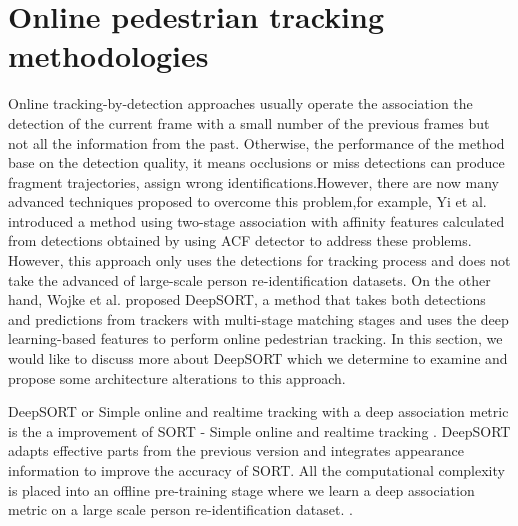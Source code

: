 \pagebreak
\section{Online pedestrian tracking methodologies}
\hspace{0.5cm} Online tracking-by-detection approaches usually operate the association the
detection of the current frame with a small number of the previous frames but not all the
information from the past. Otherwise, the performance of the method base on the detection quality,
it means occlusions or miss detections can produce fragment trajectories, assign wrong
identifications.However, there are now many advanced techniques proposed to overcome this
problem,for example, Yi et al. \cite{MultiTracking} introduced a method using two-stage association with affinity features
calculated from detections obtained by using ACF detector to address these problems. However, this approach
only uses the detections for tracking process and does not take the advanced of large-scale person re-identification datasets.
On the other hand, Wojke et al. \cite{Wojke2017simple} proposed DeepSORT, a method that takes both detections and predictions 
from trackers with multi-stage matching stages and uses the deep learning-based features to perform online pedestrian tracking.
In this section, we would like to discuss more about DeepSORT\cite{Wojke2017simple} which we determine to examine and propose some architecture alterations to this approach.\par

DeepSORT or Simple online and realtime tracking with a deep association metric \cite{Wojke2017simple} is 
the a improvement of SORT - Simple online and realtime tracking \cite{sort} . DeepSORT adapts effective parts from the previous version and integrates appearance information to improve the accuracy of SORT. All the computational complexity is placed 
into an offline pre-training stage where we learn a deep association metric on a large scale person re-identification dataset. \cite{Wojke2017simple}.
